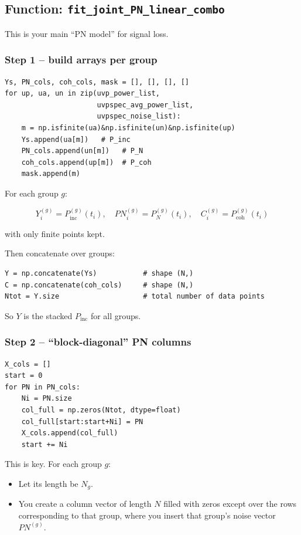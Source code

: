 \documentclass[11pt]{article}
\begin{document}
\subsection*{Function: \texttt{fit\_joint\_PN\_linear\_combo}}

This is your main ``PN model'' for signal loss.

\subsubsection*{Step 1 -- build arrays per group}

\begin{verbatim}
Ys, PN_cols, coh_cols, mask = [], [], [], []
for up, ua, un in zip(uvp_power_list,
                      uvpspec_avg_power_list,
                      uvpspec_noise_list):
    m = np.isfinite(ua)&np.isfinite(un)&np.isfinite(up)
    Ys.append(ua[m])   # P_inc
    PN_cols.append(un[m])   # P_N
    coh_cols.append(up[m])  # P_coh
    mask.append(m)
\end{verbatim}

For each group $g$:

\[
  Y^{(g)}_i = P_{\mathrm{inc}}^{(g)}(t_i), \quad
  PN^{(g)}_i = P_{N}^{(g)}(t_i), \quad
  C^{(g)}_i = P_{\mathrm{coh}}^{(g)}(t_i)
\]

with only finite points kept.

Then concatenate over groups:

\begin{verbatim}
Y = np.concatenate(Ys)           # shape (N,)
C = np.concatenate(coh_cols)     # shape (N,)
Ntot = Y.size                    # total number of data points
\end{verbatim}

So $Y$ is the stacked $P_{\mathrm{inc}}$ for all groups.

\subsubsection*{Step 2 -- ``block-diagonal'' PN columns}

\begin{verbatim}
X_cols = []
start = 0
for PN in PN_cols:
    Ni = PN.size
    col_full = np.zeros(Ntot, dtype=float)
    col_full[start:start+Ni] = PN
    X_cols.append(col_full)
    start += Ni
\end{verbatim}

This is key. For each group $g$:

\begin{itemize}[leftmargin=*]
  \item Let its length be $N_g$.
  \item You create a column vector of length $N$ filled with zeros except over the rows corresponding to that group, where you insert that group’s noise vector $PN^{(g)}$.
\end{itemize}
\end{document}
